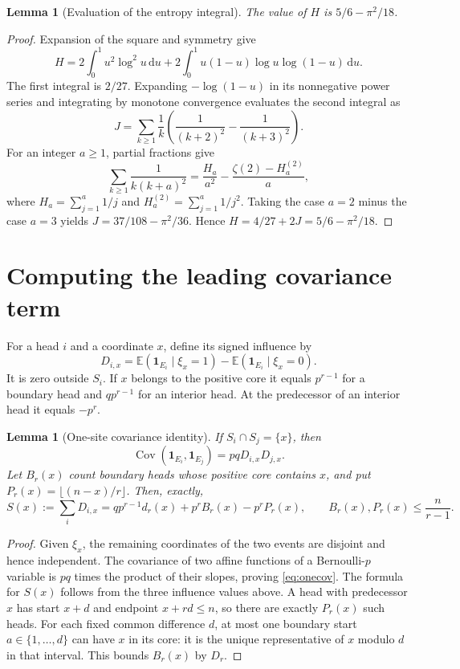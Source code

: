 \documentclass[11pt]{article}
\newtheorem{lemma}[theorem]{Lemma}
\theoremstyle{definition}\newtheorem{definition}[theorem]{Definition}
\theoremstyle{remark}\newtheorem{remark}[theorem]{Remark}
\newcommand{\EE}{\mathbb E}
\newcommand{\Cov}{\operatorname{Cov}}
\newcommand{\ind}{\mathbf 1}
\newcommand{\dd}{\,\mathrm d}
\begin{document}
\begin{lemma}[Evaluation of the entropy integral]\label{lem:H}
The value of $H$ is $5/6-\pi^2/18$.
\end{lemma}
\begin{proof}
Expansion of the square and symmetry give
\[
 H=2\int_0^1u^2\log^2u\dd u
       +2\int_0^1u(1-u)\log u\log(1-u)\dd u.
\]
The first integral is $2/27$. Expanding $-\log(1-u)$ in its nonnegative
power series and integrating by monotone convergence evaluates the second
integral as
\[
 J=\sum_{k\ge1}\frac1k
       \left(\frac1{(k+2)^2}-\frac1{(k+3)^2}\right).
\]
For an integer $a\ge1$, partial fractions give
\[
 \sum_{k\ge1}\frac1{k(k+a)^2}
   =\frac{H_a}{a^2}-\frac{\zeta(2)-H_a^{(2)}}a,
\]
where $H_a=\sum_{j=1}^a1/j$ and $H_a^{(2)}=\sum_{j=1}^a1/j^2$.
Taking the case $a=2$ minus the case $a=3$ yields
$J=37/108-\pi^2/36$. Hence
$H=4/27+2J=5/6-\pi^2/18$.
\end{proof}

\section{Computing the leading covariance term}\label{sec:variance}
For a head $i$ and a coordinate $x$, define its signed influence by
\[
 D_{i,x}=\EE(\ind_{E_i}\mid\xi_x=1)
           -\EE(\ind_{E_i}\mid\xi_x=0).
\]
It is zero outside $S_i$. If $x$ belongs to the positive core it equals
$p^{r-1}$ for a boundary head and $qp^{r-1}$ for an interior head.
At the predecessor of an interior head it equals $-p^r$.

\begin{lemma}[One-site covariance identity]\label{lem:influence}
If $S_i\cap S_j=\{x\}$, then
\begin{equation}
 \Cov(\ind_{E_i},\ind_{E_j})=pqD_{i,x}D_{j,x}.\label{eq:onecov}
\end{equation}
Let $B_r(x)$ count boundary heads whose positive core contains $x$,
and put $P_r(x)=\lfloor(n-x)/r\rfloor$. Then, exactly,
\begin{equation}
 S(x):=\sum_iD_{i,x}
   =qp^{r-1}d_r(x)+p^rB_r(x)-p^rP_r(x),\qquad
 B_r(x),P_r(x)\le \frac{n}{r-1}.\label{eq:Stotal}
\end{equation}
\end{lemma}
\begin{proof}
Given $\xi_x$, the remaining coordinates of the two events are disjoint
and hence independent. The covariance of two affine functions of a
Bernoulli-$p$ variable is $pq$ times the product of their slopes, proving
\eqref{eq:onecov}.
The formula for $S(x)$ follows from the three influence values above.
A head with predecessor $x$ has start $x+d$ and endpoint $x+rd\le n$,
so there are exactly $P_r(x)$ such heads. For each fixed common difference
$d$, at most one boundary start $a\in\{1,\ldots,d\}$ can have $x$ in its
core: it is the unique representative of $x$ modulo $d$ in that interval.
This bounds $B_r(x)$ by $D_r$.
\end{proof}
\end{document}
